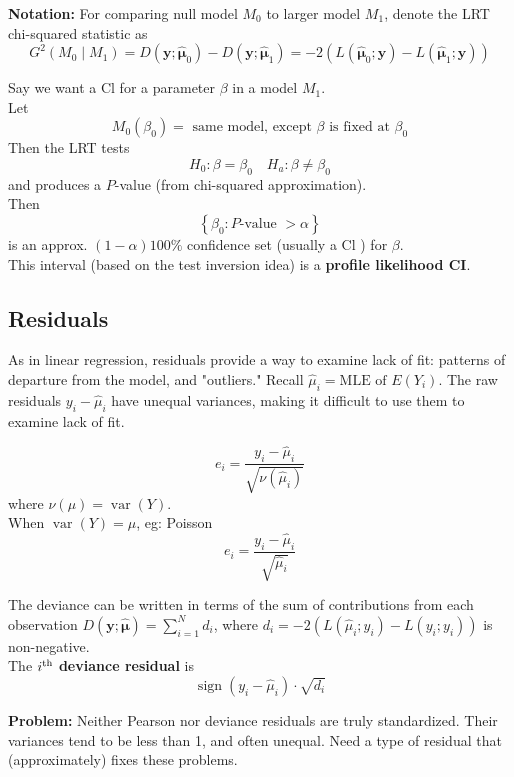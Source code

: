 \documentclass[11pt]{elegantbook}
\begin{document}
\textbf{Notation:} For comparing null model $M_0$ to larger model $M_1$, denote the LRT chi-squared statistic as $$G^2(M_0\mid M_1)=D\left(\boldsymbol{y} ; \hat{\boldsymbol{\mu}}_0\right)-D\left(\boldsymbol{y} ; \hat{\boldsymbol{\mu}}_1\right)=-2\left(L\left(\hat{\boldsymbol{\mu}}_0 ; \boldsymbol{y}\right)-\right. \left.L\left(\hat{\boldsymbol{\mu}}_1 ; \boldsymbol{y}\right)\right)$$

\begin{definition}
    \normalfont
    Say we want a $\mathrm{Cl}$ for a parameter $\beta$ in a model $M_1$.\\
    Let
    $$
    M_0\left(\beta_0\right)=\text { same model, except } \beta \text { is fixed at } \beta_0
    $$
    Then the LRT tests
    $$
    H_0: \beta=\beta_0 \quad H_a: \beta \neq \beta_0
    $$
    and produces a $P$-value (from chi-squared approximation).\\
    Then
    $$
    \left\{\beta_0: P \text {-value }>\alpha\right\}
    $$
    is an approx. $(1-\alpha) 100 \%$ confidence set (usually a $\mathrm{Cl}$ ) for $\beta$.\\
    This interval (based on the test inversion idea) is a \textbf{profile likelihood CI}.
\end{definition}

\subsection{Residuals}
As in linear regression, residuals provide a way to examine lack of fit: patterns of departure from the model, and "outliers."
Recall $\hat{\mu}_i=\mathrm{MLE} \text { of } E\left(Y_i\right)$. The raw residuals $y_i-\hat{\mu}_i$
have unequal variances, making it difficult to use them to examine lack of fit.

\begin{definition}
    \normalfont
    $$
    e_i=\frac{y_i-\hat{\mu}_i}{\sqrt{\nu\left(\hat{\mu}_i\right)}}
    $$
    where $\nu(\mu)=\operatorname{var}(Y)$.\\
    When $\operatorname{var}(Y)=\mu$, eg: Poisson
    $$
    e_i=\frac{y_i-\hat{\mu}_i}{\sqrt{\hat{\mu}_i}}
    $$
\end{definition}

\begin{definition}
    \normalfont
    The deviance can be written in terms of the sum of contributions from each observation $D(\boldsymbol{y} ; \hat{\boldsymbol{\mu}})=\sum_{i=1}^N d_i
    $, where $d_i=-2\left(L\left(\hat{\mu}_i ; y_i\right)-L\left(y_i ; y_i\right)\right)$ is non-negative.\\
    The $i^\textnormal{th}$ \textbf{deviance residual} is $$\operatorname{sign}\left(y_i-\hat{\mu}_i\right) \cdot \sqrt{d_i}
    $$
\end{definition}
\textbf{Problem:} Neither Pearson nor deviance residuals are truly standardized. Their variances tend to be less than 1, and often unequal. Need a type of residual that (approximately) fixes these problems.
\end{document}
